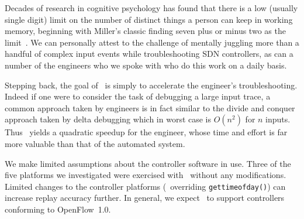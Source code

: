 
 Decades of research in cognitive
psychology has found that there is a low (usually single digit) limit on the
number of distinct things a person can keep in working memory, beginning with
Miller's classic finding seven plus or minus two as the limit~\cite{miller56seven}.  We can
personally attest to the challenge of mentally juggling more than a
handful of complex input events while troubleshooting SDN controllers,
as can a number of the engineers who we spoke with who do this work on a daily
basis.

Stepping back, the goal of \projectname~is simply to accelerate the engineer's
troubleshooting.  Indeed if one were to consider the task of debugging a large
input trace, a common approach taken by engineers is in fact similar to the
divide and conquer approach taken by delta debugging which in worst case is
$O(n^2)$ for $n$ inputs.  Thus \projectname~yields a quadratic speedup for the
engineer, whose time and effort is far more valuable than that of the automated
system.

 We make limited
assumptions about the controller software in use. Three of the five platforms
we investigated were exercised with \projectname~without any modifications.
Limited changes to the controller platforms (\eg~overriding
{\tt gettimeofday()}) can increase replay accuracy further.
In general, we expect \projectname~to support controllers conforming to
OpenFlow~1.0. %


